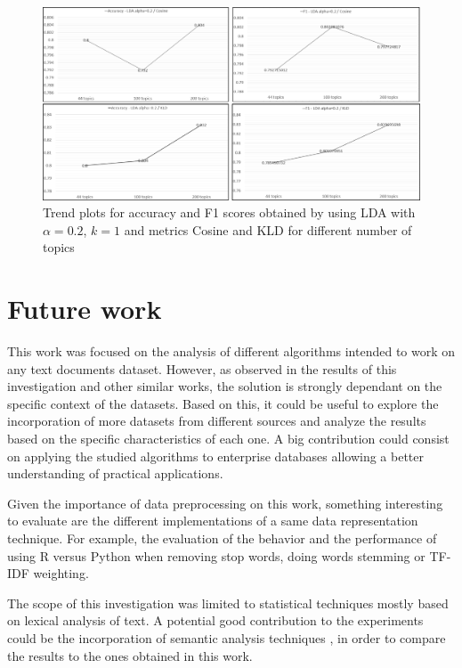 \documentclass[preprint,12pt,3p]{elsarticle}
\begin{document}
\begin{figure}[h]
\caption{Trend plots for accuracy and F1 scores obtained by using LDA with $\alpha=0.2$, $k=1$ and metrics Cosine and KLD for different number of topics}
\label{figure-trend-plot}
\includegraphics[width=\textwidth]{trend_plot_LDA_more_topics}
\end{figure}


\section{Future work}
\label{future_work}

This work was focused on the analysis of different algorithms intended to work on any text documents dataset. However, as observed in the results of this investigation and other similar works, the solution is strongly dependant on the specific context of the datasets. Based on this, it could be useful to explore the incorporation of more datasets from different sources and analyze the results based on the specific characteristics of each one. A big contribution could consist on applying the studied algorithms to enterprise databases allowing a better understanding of practical applications.\par

Given the importance of data preprocessing on this work, something interesting to evaluate are the different implementations of a same data representation technique. For example, the evaluation of the behavior and the performance of using R versus Python when removing stop words, doing words stemming or TF-IDF weighting.\par

The scope of this investigation was limited to statistical techniques mostly based on lexical analysis of text. A potential good contribution to the experiments could be the incorporation of semantic analysis techniques \cite{seifzadeh2015short,martinez2014analysis,islam2008semantic}, in order to compare the results to the ones obtained in this work.\par 
\end{document}
